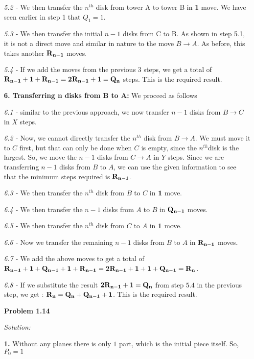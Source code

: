 \documentclass[12pt]{article}
\begin{document}
\textit {5.2 -} We then transfer the $n^{th}$ disk from tower A to tower B in {\bf {1}} move. We have seen earlier in step 1 that $Q_1 = 1$.

\textit {5.3 -} We then transfer the initial $n-1$ disks from C to B. As shown in step 5.1, it is not a direct move and similar in nature to the move $B\rightarrow A$. As before, this takes another ${\bf R_{n-1}}$ moves.

\textit {5.4 -} If we add the moves from the previous 3 steps, we get a total of ${\bf R_{n-1}}+\bf {1}+{\bf R_{n-1}} = {\bf 2R_{n-1}}+ {\bf {1}} = {\bf Q_n}$ steps. This is the required result.

{\bf 6. Transferring n disks from B to A: } {We proceed as follows}

\textit {6.1 -} similar to the previous approach, we now transfer $n-1$ disks from $B\rightarrow C$ in $X$ steps.

\textit {6.2 -} Now, we cannot directly transfer the $n^{th}$ disk from $B\rightarrow A$. We must move it to $C$ first, but that can only be done when $C$ is empty, since the $n^{th}$disk is the largest. So, we move the $n-1$ disks from $C\rightarrow A$ in $Y$ steps. Since we are transferring $n-1$ disks from $B$ to $A$, we can use the given information to see that the minimum steps required is $\bf {R_{n-1}}$.

\textit {6.3 -} We then transfer the $n^{th}$ disk from $B$ to $C$ in $\bf {1}$ move.

\textit {6.4 -} We then transfer the $n-1$ disks from $A$ to $B$ in $\bf {Q_{n-1}}$ moves.

\textit {6.5 -} We then transfer the $n^{th}$ disk from $C$ to $A$ in $\bf {1}$ move.

\textit {6.6 -} Now we transfer the remaining $n-1$ disks from $B$ to $A$ in $\bf {R_{n-1}}$ moves.

\textit {6.7 -} We add the above moves to get a total of $\bf {R_{n-1}} + 1 + \bf {Q_{n-1}} + 1 + \bf {R_{n-1}} = \bf {2R_{n-1}} + 1 + 1 + \bf {Q_{n-1}} = \bf {R_n}$.

\textit {6.8 -} If we substitute the result ${\bf 2R_{n-1}}+ {\bf {1}} = {\bf Q_n}$ from step $5.4$ in the previous step, we get : $\bf {R_n = Q_n + Q_{n-1} + 1}$. This is the required result.

\medskip
\medskip

\noindent
{\bf Problem 1.14}

\textit {Solution:}

{\bf 1. } Without any planes there is only $1$ part, which is the initial piece itself. So, $P_0 = 1$
\end{document}
